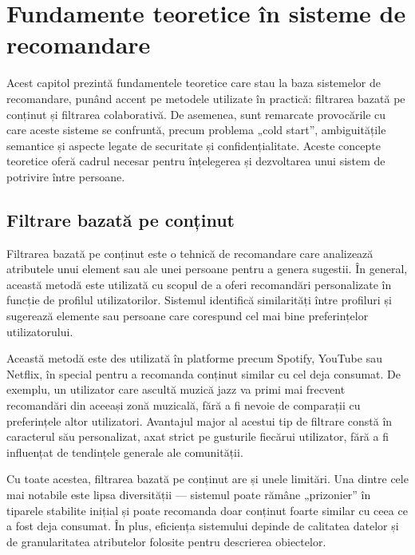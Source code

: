 \chapter{Fundamente teoretice în sisteme de recomandare}
\label{chap:ch3}

Acest capitol prezintă fundamentele teoretice care stau la baza sistemelor de recomandare, punând accent pe metodele utilizate în practică: filtrarea bazată pe conținut și filtrarea colaborativă.
De asemenea, sunt remarcate provocările cu care aceste sisteme se confruntă, precum problema „cold start”, ambiguitățile semantice și aspecte legate de securitate și confidențialitate.
Aceste concepte teoretice oferă cadrul necesar pentru înțelegerea și dezvoltarea unui sistem de potrivire între persoane.

\section{Filtrare bazată pe conținut}
\label{sec:ch3sec1}

Filtrarea bazată pe conținut este o tehnică de recomandare care analizează atributele unui element sau ale unei persoane pentru a genera sugestii.
În general, această metodă este utilizată cu scopul de a oferi recomandări personalizate în funcție de profilul utilizatorilor.
Sistemul identifică similarități între profiluri și sugerează elemente sau persoane care corespund cel mai bine preferințelor utilizatorului\cite{kumar2018recommendation}.
\par
Această metodă este des utilizată în platforme precum Spotify, YouTube sau Netflix, în special pentru a recomanda conținut similar cu cel deja consumat. 
De exemplu, un utilizator care ascultă muzică jazz va primi mai frecvent recomandări din aceeași zonă muzicală, fără a fi nevoie de comparații cu preferințele altor utilizatori. 
Avantajul major al acestui tip de filtrare constă în caracterul său personalizat, axat strict pe gusturile fiecărui utilizator, fără a fi influențat de tendințele generale ale comunității.
\par
Cu toate acestea, filtrarea bazată pe conținut are și unele limitări. 
Una dintre cele mai notabile este lipsa diversității — sistemul poate rămâne „prizonier” în tiparele stabilite inițial și poate recomanda doar conținut foarte similar cu ceea ce a fost deja consumat. 
În plus, eficiența sistemului depinde de calitatea datelor și de granularitatea atributelor folosite pentru descrierea obiectelor.

